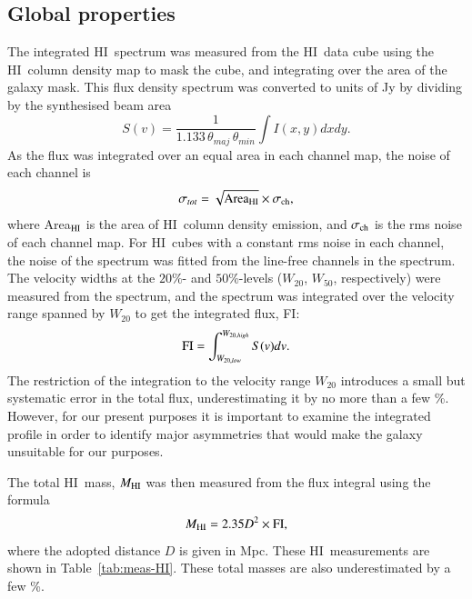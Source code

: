 \documentclass[traditabstract]{aa} %
\newcommand\HI{H{\small I}}
\begin{document}
\subsection{Global properties}
\label{sec:global-HI}

The integrated \HI\ spectrum was measured from the \HI\ data cube using
the \HI\ column density map to mask the cube, and integrating over the
area of the galaxy mask. This flux density spectrum was converted to
units of Jy by dividing by the synthesised beam area
\begin{equation}
S(v) = \frac{1}{1.133\,\theta_{maj}\,\theta_{min}}\int I(x,y) dx dy.
\end{equation}
As the flux was integrated over an equal area in each channel map, the
noise of each channel is
\begin{equation}
\sigma_{tot} = \sqrt{{\rm Area}_{\rm HI}} \times \sigma_{\rm ch},
\end{equation}
where Area$_{\rm HI}$ is the area of \HI\ column density emission, and
$\sigma_{\rm ch}$ is the rms noise of each channel map. For \HI\ cubes with
a constant rms noise in each channel, the noise of the spectrum was
fitted from the line-free channels in the spectrum.  The velocity
widths at the $20\%$- and $50\%$-levels ($W_{20}$, $W_{50}$,
respectively) were measured from the spectrum, and the spectrum was
integrated over the velocity range spanned by $W_{20}$ to get the
integrated flux, FI:
\begin{equation}
{\rm FI} = \int^{W_{20,high}}_{W_{20,low}} S(v) dv.
\end{equation}
The restriction of the integration to the velocity range $W_{20}$ introduces
a small but systematic error in the total flux, underestimating
it by no more than a few \%. However, for our present purposes it is important
to examine the integrated profile in order to identify major asymmetries that
would make the galaxy unsuitable for our purposes.


The total \HI\ mass, $M_{\rm HI}$ was then measured from the flux integral
using the formula
\begin{equation}
M_{\rm HI} = 2.35 D^2 \times {\rm FI},
\end{equation}
where the adopted distance $D$ is given in Mpc. These \HI\ measurements
are shown in Table~\ref{tab:meas-HI}. These total masses are also
underestimated by a few \%.
\end{document}
